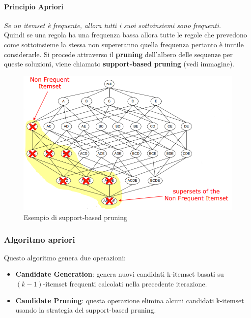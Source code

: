 \paragraph{Principio Apriori} \textit{Se un itemset è frequente, allora tutti i suoi sottoinsiemi sono frequenti.}\\
Quindi se una regola ha una frequenza bassa allora tutte le regole che prevedono come sottoinsieme la stessa non supereranno quella frequenza pertanto è inutile considerarle. Si procede attraverso il \textbf{pruning} dell'albero delle sequenze per queste soluzioni, viene chiamato \textbf{support-based pruning} (vedi immagine).

\begin{figure}[H]
	\centering
	\includegraphics[height=0.5 \linewidth]{association/pict/pruning.png}
	\caption{Esempio di support-based pruning}
\end{figure}

\subsubsection{Algoritmo apriori}
Questo algoritmo genera due operazioni:
\begin{itemize}
	\item \textbf{Candidate Generation}: genera nuovi candidati k-itemset basati su $(k-1)$-itemset frequenti calcolati nella precedente iterazione.
	\item \textbf{Candidate Pruning}: questa operazione elimina alcuni candidati k-itemset usando la strategia del support-based pruning.
\end{itemize}

